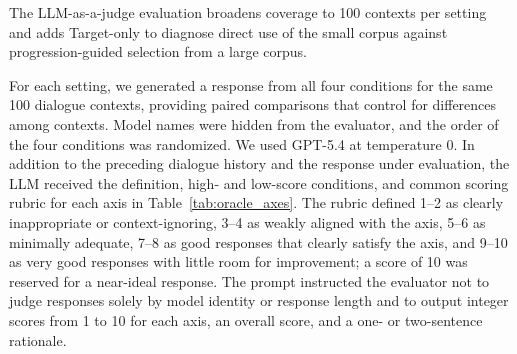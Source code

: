 \documentclass[manuscript,review,anonymous]{acmart}
\begin{document}
The LLM-as-a-judge evaluation broadens coverage to 100 contexts per setting and adds Target-only to diagnose direct use of the small corpus against progression-guided selection from a large corpus.

For each setting, we generated a response from all four conditions for the same 100 dialogue contexts, providing paired comparisons that control for differences among contexts. Model names were hidden from the evaluator, and the order of the four conditions was randomized. We used GPT-5.4 at temperature 0. In addition to the preceding dialogue history and the response under evaluation, the LLM received the definition, high- and low-score conditions, and common scoring rubric for each axis in Table~\ref{tab:oracle_axes}. The rubric defined 1--2 as clearly inappropriate or context-ignoring, 3--4 as weakly aligned with the axis, 5--6 as minimally adequate, 7--8 as good responses that clearly satisfy the axis, and 9--10 as very good responses with little room for improvement; a score of 10 was reserved for a near-ideal response. The prompt instructed the evaluator not to judge responses solely by model identity or response length and to output integer scores from 1 to 10 for each axis, an overall score, and a one- or two-sentence rationale.
\end{document}
